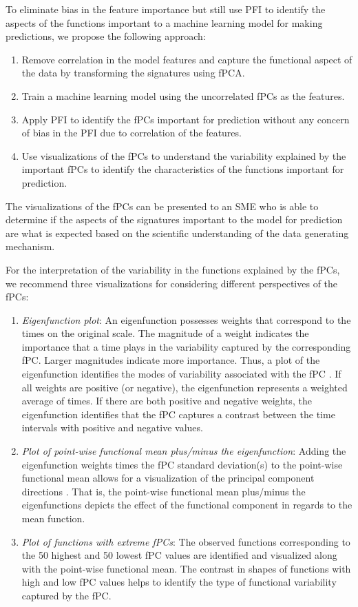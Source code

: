 \documentclass[letterpaper]{article}
\begin{document}
To eliminate bias in the feature importance but still use PFI to identify the aspects of the functions important to a machine learning model for making predictions, we propose the following approach:

\begin{enumerate}
\item Remove correlation in the model features and capture the functional aspect of the data by transforming the signatures using fPCA.
\item Train a machine learning model using the uncorrelated fPCs as the features.
\item Apply PFI to identify the fPCs important for prediction without any concern of bias in the PFI due to correlation of the features.
\item Use visualizations of the fPCs to understand the variability explained by the important fPCs to identify the characteristics of the functions important for prediction.
\end{enumerate}

The visualizations of the fPCs can be presented to an SME who is able to determine if the aspects of the signatures important to the model for prediction are what is expected based on the scientific understanding of the data generating mechanism.

For the interpretation of the variability in the functions explained by the fPCs, we recommend three visualizations for considering different perspectives of the fPCs:

\begin{enumerate}
\item \textit{Eigenfunction plot}: An eigenfunction possesses weights that correspond to the times on the original scale. The magnitude of a weight indicates the importance that a time plays in the variability captured by the corresponding fPC. Larger magnitudes indicate more importance. Thus, a plot of the eigenfunction identifies the modes of variability associated with the fPC \cite{ramsay:2005}. If all weights are positive (or negative), the eigenfunction represents a weighted average of times. If there are both positive and negative weights, the eigenfunction identifies that the fPC captures a contrast between the time intervals with positive and negative values. 
\item \textit{Plot of point-wise functional mean plus/minus the eigenfunction}: Adding the eigenfunction weights times the fPC standard deviation(s) to the point-wise functional mean allows for a visualization of the principal component directions \cite{ramsay:2005}. That is, the point-wise functional mean plus/minus the eigenfunctions depicts the effect of the functional component in regards to the mean function.
\item \textit{Plot of functions with extreme fPCs}: The observed functions corresponding to the 50 highest and 50 lowest fPC values are identified and visualized along with the point-wise functional mean. The contrast in shapes of functions with high and low fPC values helps to identify the type of functional variability captured by the fPC.
\end{enumerate}
\end{document}
